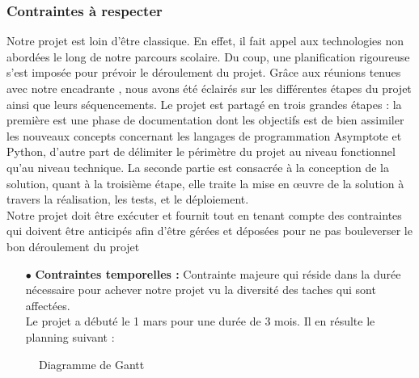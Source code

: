 \documentclass[a4paper]{report}
\begin{document}
\subsubsection{Contraintes à respecter}
Notre projet est loin d’être classique. En effet, il fait appel aux technologies non abordées le long de notre parcours scolaire. Du coup, une planification rigoureuse s’est imposée pour prévoir le déroulement du projet. Grâce aux réunions tenues avec notre encadrante , nous avons été éclairés sur les différentes étapes du projet ainsi que leurs séquencements. Le projet est partagé en trois grandes étapes : la première est une phase de documentation dont les objectifs est de bien assimiler les nouveaux concepts concernant les langages de programmation Asymptote et Python, d’autre part de délimiter le périmètre du projet au niveau
fonctionnel qu’au niveau technique. La seconde partie est consacrée à la conception de la solution, quant à la troisième étape, elle traite la mise en œuvre de la solution à travers la réalisation, les tests, et le déploiement.\\
Notre projet doit être exécuter et fournit tout en tenant compte des contraintes qui doivent être anticipés afin d'être gérées et déposées pour ne pas bouleverser le bon déroulement du projet
\begin{itemize}
    \item[$\bullet$] \textbf{Contraintes temporelles : }Contrainte majeure qui réside dans la durée nécessaire pour achever notre projet vu la diversité des taches qui sont affectées.\\
    Le projet a débuté le 1 mars pour une durée de 3 mois. Il en résulte le planning suivant :
\end{itemize}
\newpage
\begin{figure}[!h]
    \centering
    \caption{Diagramme de Gantt}
    \label{fig:Diagramme de Gantt}
\end{figure}
\newpage
\renewcommand{\labelitemi}{\textbullet}
\renewcommand\labelitemii{\textperiodcentered}
\end{document}
